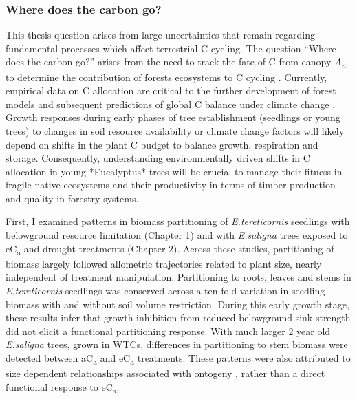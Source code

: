 \documentclass[a4paper]{article}
\begin{document}
\subsubsection*{Where does the carbon go?}
This thesis question arises from large uncertainties that remain regarding fundamental processes which affect terrestrial C cycling.  The question “Where does the carbon go?” arises from the need to track the fate of C from canopy \textit{A\textsubscript{n}} to determine the contribution of forests ecosystems to C cycling \citep{litton2007carbon}. Currently, empirical data on C allocation are critical to the further development of forest models and subsequent predictions of global C balance under climate change \citep{franklin2012modeling}. Growth responses during early phases of tree establishment (seedlings or young trees) to changes in soil resource availability or climate change factors will likely depend on shifts in the plant C budget to balance growth, respiration and storage. Consequently, understanding environmentally driven shifts in C allocation in young *Eucalyptus* trees will be crucial to manage their fitness in fragile native ecosystems and their productivity in terms of timber production and quality in forestry systems.

First, I examined patterns in biomass partitioning of \textit{E.tereticornis} seedlings with belowground resource limitation (Chapter 1) and with \textit{E.saligna} trees exposed to eC\textsubscript{a} and drought treatments (Chapter 2). Across these studies, partitioning of biomass largely followed allometric trajectories related to plant size, nearly independent of treatment manipulation. Partitioning to roots, leaves and stems in \textit{E.tereticornis} seedlings was conserved across a ten-fold variation in seedling biomass with and without soil volume restriction. During this early growth stage, these results infer that growth inhibition from reduced belowground sink strength did not elicit a functional partitioning response. With much larger 2 year old \textit{E.saligna} trees, grown in WTCs, differences in partitioning to stem biomass were detected between aC\textsubscript{a} and eC\textsubscript{a} treatments. These patterns were also attributed to size dependent relationships associated with ontogeny \citep[see]{poorter2015does}, rather than a direct functional response to eC\textsubscript{a}.
\end{document}

